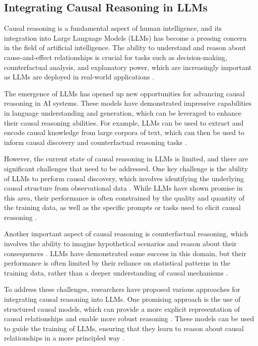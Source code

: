 \documentclass[11pt]{article}
\begin{document}
\subsection{Integrating Causal Reasoning in LLMs}

Causal reasoning is a fundamental aspect of human intelligence, and its integration into Large Language Models (LLMs) has become a pressing concern in the field of artificial intelligence. The ability to understand and reason about cause-and-effect relationships is crucial for tasks such as decision-making, counterfactual analysis, and explanatory power, which are increasingly important as LLMs are deployed in real-world applications \cite{ref277}.

The emergence of LLMs has opened up new opportunities for advancing causal reasoning in AI systems. These models have demonstrated impressive capabilities in language understanding and generation, which can be leveraged to enhance their causal reasoning abilities. For example, LLMs can be used to extract and encode causal knowledge from large corpora of text, which can then be used to inform causal discovery and counterfactual reasoning tasks \cite{ref327,ref298}.

However, the current state of causal reasoning in LLMs is limited, and there are significant challenges that need to be addressed. One key challenge is the ability of LLMs to perform causal discovery, which involves identifying the underlying causal structure from observational data \cite{ref328}. While LLMs have shown promise in this area, their performance is often constrained by the quality and quantity of the training data, as well as the specific prompts or tasks used to elicit causal reasoning \cite{ref329}.

Another important aspect of causal reasoning is counterfactual reasoning, which involves the ability to imagine hypothetical scenarios and reason about their consequences \cite{ref330}. LLMs have demonstrated some success in this domain, but their performance is often limited by their reliance on statistical patterns in the training data, rather than a deeper understanding of causal mechanisms \cite{ref331}.

To address these challenges, researchers have proposed various approaches for integrating causal reasoning into LLMs. One promising approach is the use of structured causal models, which can provide a more explicit representation of causal relationships and enable more robust reasoning \cite{ref332}. These models can be used to guide the training of LLMs, ensuring that they learn to reason about causal relationships in a more principled way \cite{ref333}.
\end{document}
